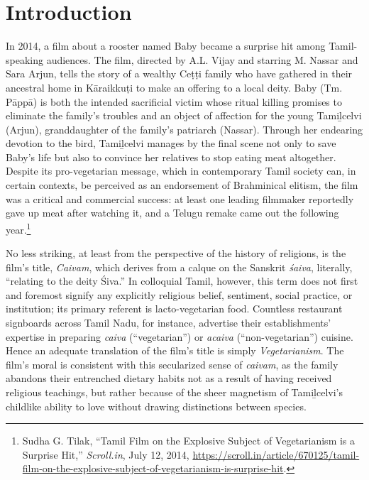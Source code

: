 
\setcounter{page}{1}


\raggedbottom
      
\section{Introduction}
      In 2014, a film about a rooster named Baby became a surprise hit among Tamil-speaking audiences. The film, directed by A.\thinskip{}L. Vijay and starring M. Nassar and Sara Arjun, tells the story of a wealthy Ceṭṭi family who have gathered in their ancestral home in Kāraikkuṭi to make an offering to a local deity. Baby (Tm. Pāppā) is both the intended sacrificial victim whose ritual killing promises to eliminate the family’s troubles and an object of affection for the young Tamiḻcelvi (Arjun), granddaughter of the family’s patriarch (Nassar). Through her endearing devotion to the bird, Tamiḻcelvi manages by the final scene not only to save Baby’s life but also to convince her relatives to stop eating meat altogether. Despite its pro-vegetarian message, which in contemporary Tamil society can, in certain contexts, be perceived as an endorsement of Brahminical elitism, the film was a critical and commercial success: at least one leading filmmaker reportedly gave up meat after watching it, and a Telugu remake came out the following year.\footnote{%
Sudha G. Tilak, “Tamil Film on the Explosive Subject of Vegetarianism is a Surprise Hit,” \emph{Scroll.in}, July 12, 2014, \url{https://scroll.in/article/670125/tamil-film-on-the-explosive-subject-of-vegetarianism-is-surprise-hit}.
}



No less striking, at least from the perspective of the history of religions, is the film’s title, \emph{{Caivam}}, which derives from a calque on the Sanskrit \emph{śaiva}, literally, “relating to the deity Śiva.” In colloquial Tamil, however, this term does not first and foremost signify any explicitly religious belief, sentiment, social practice, or institution; its primary referent is lacto-vegetarian food. Countless restaurant signboards across Tamil Nadu, for instance, advertise their establishments’ expertise in preparing \emph{caiva} (“vegetarian”) or \emph{acaiva} (“non-vegetarian”) cuisine. Hence an adequate translation of the film’s title is simply \emph{Vegetarianism}. The film’s moral is consistent with this secularized sense of \emph{caivam}, as the family abandons their entrenched dietary habits not as a result of having received religious teachings, but rather because of the sheer magnetism of Tamiḻcelvi’s childlike ability to love without drawing distinctions between species.


